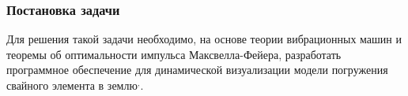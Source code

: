 \documentclass[10pt, pdf, hyperref={unicode}]{beamer}
\begin{document}
\begin{frame}
\begin{center}
\begin{minipage}[h]{0.97\linewidth}
\begin{minipage}[h]{0.29\linewidth}
\begin{figure}[h]
                    \end{figure}
                \end{minipage}
            \end{minipage}
        \end{center}
    \end{frame}


    \begin{frame}
        \frametitle{Постановка задачи}
        \begin{center}
            \begin{minipage}[h]{0.97\linewidth}
                Для решения такой задачи необходимо, на основе теории вибрационных машин и теоремы об оптимальности импульса Максвелла-Фейера,
                разработать программное обеспечение для динамической визуализации модели погружения свайного элемента в землю\footnotemark[1]${}^,$\footnotemark[2].
            \end{minipage}
        \end{center}
    \end{frame}
\end{document}
